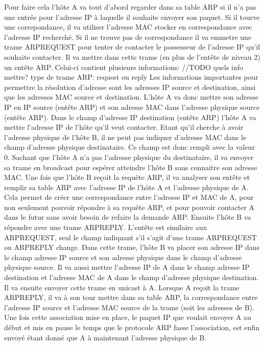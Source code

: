Pour faire cela l'hôte A va tout d'abord regarder dans sa table ARP si il n'a
pas une entrée pour l'adresse IP à laquelle il souhaite envoyer son paquet. Si
il tourve une correpondance, il va utiliser l'adresse MAC stocker en
correspondance avec l'adresse IP recherché.  Si il ne trouve pas de
correspondance il va emmetre une trame ARPREQUEST pour tenter de contacter le
possesseur de l'adresse IP qu'il souhaite contacter. Il va mettre dans cette
trame (en plus de l'entête de niveau 2) un entête ARP. Celui-ci contient
plusieurs informations:
//TODO quels info mettre? type de trame ARP: request ou reply
Les informations importantes pour permettre la résolution d'adresse sont les
adresses IP source et destination, ainsi que les adresses MAC source et
destination.  L'hôte A va donc mettre son adresse IP en IP source (entête ARP)
et son adresse MAC dans l'adresse physique source (entête ARP). Dans le champ
d'adresse IP destination (entête ARP) l'hôte A va mettre l'adresse IP de l'hôte
qu'il veut contacter. Etant qu'il cherche à avoir l'adresse physique de l'hôte
B, il ne peut pas indiquer d'adresse MAC dans le champ d'adresse physique
destinataire. Ce champ est donc rempli avec la valeur 0.  Sachant que l'hôte A
n'a pas l'adresse physique du destinataire, il va envoyer sa trame en broadcast
pour espérer atteindre l'hôte B sans connaitre son adresse MAC.  Une fois que
l'hôte B reçoit la requète ARP, il va analyser son entête et remplir sa table
ARP avec l'adresse IP de l'hôte A et l'adresse physique de A. Cela permet de
créer une correspondance entre l'adresse IP et MAC de A, pour non seulement
pouvoir répondre à sa requête ARP, et pour pouvoir contacter A dans le futur
sans avoir besoin de refaire la demande ARP.  Ensuite l'hôte B va répondre avec
une trame ARPREPLY. L'entête est similaire aux ARPREQUEST, seul le champ
indiquant s'il s'agit d'une trame ARPREQUEST ou ARPREPLY change. Dans cette
trame, l'hôte B va placer son adresse IP dans le champ adresse IP source et son
adresse physique dans le champ d'adresse physique source. Il va aussi mettre
l'adresse IP de A dans le champ adresse IP destination et l'adresse MAC de A
dans le champ d'adresse physique destination. Il va ensuite envoyer cette trame
en unicast à A.  Lorsque A reçoit la trame ARPREPLY, il va à son tour mettre
dans sa table ARP, la correspondance entre l'adresse IP source et l'adresse MAC
source de la trame (soit les adresses de B).  Une fois cette association mise
en place, le paquet IP que voulait envoyer A au début et mis en pause le temps
que le protocole ARP fasse l'association, est enfin envoyé étant donné que A à
maintenant l'adresse physique de B.

